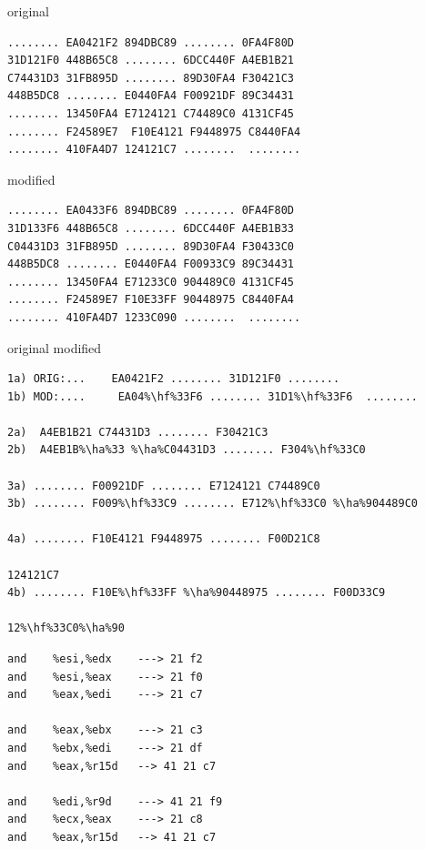 \documentclass[conference]{IEEEtran}
\begin{document}
original
\begin{lstlisting}[style=hex]
........ EA0421F2 894DBC89 ........ 0FA4F80D
31D121F0 448B65C8 ........ 6DCC440F A4EB1B21
C74431D3 31FB895D ........ 89D30FA4 F30421C3
448B5DC8 ........ E0440FA4 F00921DF 89C34431
........ 13450FA4 E7124121 C74489C0 4131CF45
........ F24589E7  F10E4121 F9448975 C8440FA4
........ 410FA4D7 124121C7 ........  ........
\end{lstlisting}

modified
\begin{lstlisting}[style=hex]
........ EA0433F6 894DBC89 ........ 0FA4F80D 
31D133F6 448B65C8 ........ 6DCC440F A4EB1B33
C04431D3 31FB895D ........ 89D30FA4 F30433C0 
448B5DC8 ........ E0440FA4 F00933C9 89C34431
........ 13450FA4 E71233C0 904489C0 4131CF45
........ F24589E7 F10E33FF 90448975 C8440FA4 
........ 410FA4D7 1233C090 ........  ........
\end{lstlisting}



original
modified
\newcommand{\hf}{\makebox[0pt][l]{\color{green}\rule[-3pt]{0.08\linewidth}{11pt}}}
\newcommand{\ha}{\makebox[0pt][l]{\color{green}\rule[-3pt]{0.04\linewidth}{11pt}}}

\begin{lstlisting}[style=hex,escapechar=\%]
1a) ORIG:...    EA0421F2 ........ 31D121F0 ........
1b) MOD:....     EA04%\hf%33F6 ........ 31D1%\hf%33F6  ........

2a)  A4EB1B21 C74431D3 ........ F30421C3
2b)  A4EB1B%\ha%33 %\ha%C04431D3 ........ F304%\hf%33C0

3a) ........ F00921DF ........ E7124121 C74489C0
3b) ........ F009%\hf%33C9 ........ E712%\hf%33C0 %\ha%904489C0 

4a) ........ F10E4121 F9448975 ........ F00D21C8

124121C7
4b) ........ F10E%\hf%33FF %\ha%90448975 ........ F00D33C9

12%\hf%33C0%\ha%90
\end{lstlisting}

\clearpage

\begin{lstlisting}[style=asm]
and    %esi,%edx    ---> 21 f2 
and    %esi,%eax    ---> 21 f0
and    %eax,%edi    ---> 21 c7 

and    %eax,%ebx    ---> 21 c3
and    %ebx,%edi    ---> 21 df 
and    %eax,%r15d   --> 41 21 c7

and    %edi,%r9d    ---> 41 21 f9
and    %ecx,%eax    ---> 21 c8
and    %eax,%r15d   --> 41 21 c7
\end{lstlisting}
\end{document}
